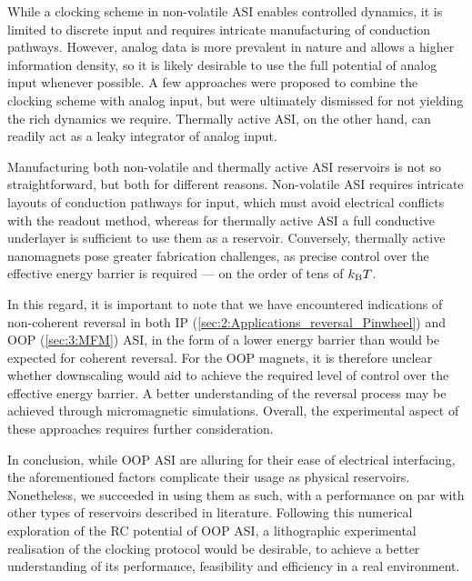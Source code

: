 While a clocking scheme in non-volatile ASI enables controlled dynamics, it is limited to discrete input and requires intricate manufacturing of conduction pathways.
However, analog data is more prevalent in nature and allows a higher information density, so it is likely desirable to use the full potential of analog input whenever possible.
A few approaches were proposed to combine the clocking scheme with analog input, but were ultimately dismissed for not yielding the rich dynamics we require.
Thermally active ASI, on the other hand, can readily act as a leaky integrator of analog input. \par
Manufacturing both non-volatile and thermally active ASI reservoirs is not so straightforward, but both for different reasons.
Non-volatile ASI requires intricate layouts of conduction pathways for input, which must avoid electrical conflicts with the readout method, whereas for thermally active ASI a full conductive underlayer is sufficient to use them as a reservoir.
Conversely, thermally active nanomagnets pose greater fabrication challenges, as precise control over the effective energy barrier is required --- on the order of tens of $\kBT$. \par
In this regard, it is important to note that we have encountered indications of non-coherent reversal in both IP (\cref{sec:2:Applications_reversal_Pinwheel}) and OOP (\cref{sec:3:MFM}) ASI, in the form of a lower energy barrier than would be expected for coherent reversal.
For the OOP magnets, it is therefore unclear whether downscaling would aid to achieve the required level of control over the effective energy barrier.
A better understanding of the reversal process may be achieved through micromagnetic simulations.
Overall, the experimental aspect of these approaches requires further consideration. \\\par

In conclusion, while OOP ASI are alluring for their ease of electrical interfacing, the aforementioned factors complicate their usage as physical reservoirs.
Nonetheless, we succeeded in using them as such, with a performance on par with other types of reservoirs described in literature.
Following this numerical exploration of the RC potential of OOP ASI, a lithographic experimental realisation of the clocking protocol would be desirable, to achieve a better understanding of its performance, feasibility and efficiency in a real environment.



